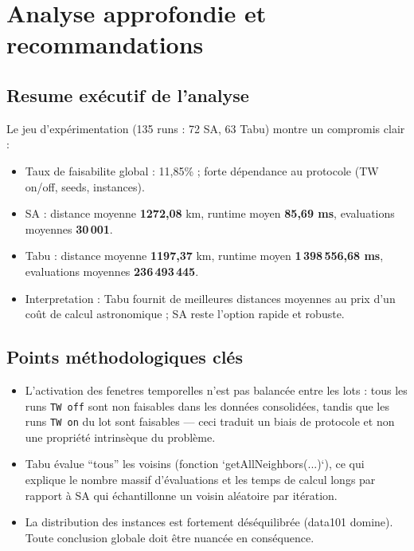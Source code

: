 \chapter{Analyse approfondie et recommandations}
\label{ch:analyse_profonde}

\section*{Resume exécutif de l'analyse}
Le jeu d'expérimentation (135 runs : 72 SA, 63 Tabu) montre un compromis clair :
\begin{itemize}[leftmargin=1.2cm]
  \item Taux de faisabilite global : 11,85\% ; forte dépendance au protocole (TW on/off, seeds, instances).
  \item SA : distance moyenne \textbf{1272,08} km, runtime moyen \textbf{85,69 ms}, evaluations moyennes \textbf{30\,001}.
  \item Tabu : distance moyenne \textbf{1197,37} km, runtime moyen \textbf{1\,398\,556,68 ms}, evaluations moyennes \textbf{236\,493\,445}.
  \item Interpretation : Tabu fournit de meilleures distances moyennes au prix d'un coût de calcul astronomique ; SA reste l'option rapide et robuste.
\end{itemize}

\section*{Points méthodologiques clés}
\begin{itemize}[leftmargin=1.2cm]
  \item L'activation des fenetres temporelles n'est pas balancée entre les lots : tous les runs \texttt{TW\ off} sont non faisables dans les données consolidées, tandis que les runs \texttt{TW\ on} du lot sont faisables — ceci traduit un biais de protocole et non une propriété intrinsèque du problème.
  \item Tabu évalue ``tous'' les voisins (fonction `getAllNeighbors(...)`), ce qui explique le nombre massif d'évaluations et les temps de calcul longs par rapport à SA qui échantillonne un voisin aléatoire par itération.
  \item La distribution des instances est fortement déséquilibrée (data101 domine). Toute conclusion globale doit être nuancée en conséquence.
\end{itemize}


